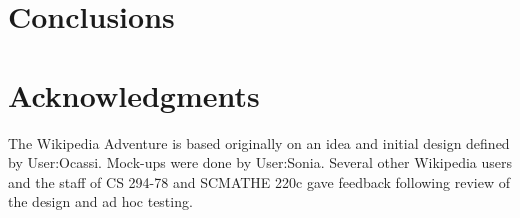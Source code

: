 \documentclass{acm_proc_article-sp}
\begin{document}
\section{Conclusions}

\section{Acknowledgments}
The Wikipedia Adventure is based originally on an idea and
initial design defined by User:Ocassi. Mock-ups
were done by User:Sonia. Several
other Wikipedia users and the staff of
CS 294-78 and SCMATHE 220c gave feedback following
review of the design and ad hoc testing.

%

\end{document}
